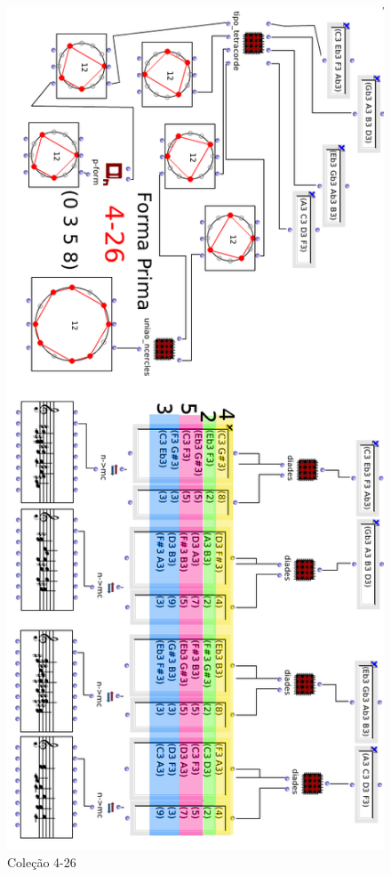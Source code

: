 \documentclass[
	12pt,				%
	openright,			%
	twoside,			%
	a4paper,			%
	english,			%
	french,				%
	spanish,			%
	brazil				%
	]{abntex2}
\begin{document}
\begin{figure}[!h]
	\caption{\label{fig_grafico} Coleção 4-26 }
	\begin{center}
	    \includegraphics[scale=0.5]{octa/permuta4_26.png}
	\end{center}
\end{figure}
\end{document}
